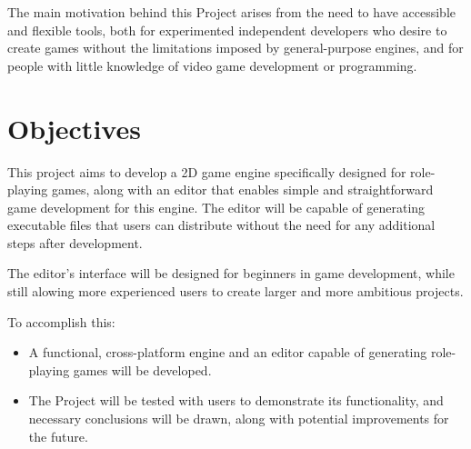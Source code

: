 \medskip

The main motivation behind this Project arises from the need to have accessible and flexible tools, both for experimented independent developers who desire to create games without the limitations imposed by general-purpose engines, and for people with little knowledge of video game development or programming.

\section*{Objectives}
This project aims to develop a 2D game engine specifically designed for role-playing games, along with an editor that enables simple and straightforward game development for this engine. The editor will be capable of generating executable files that users can distribute without the need for any additional steps after development.

\smallskip

The editor's interface will be designed for beginners in game development, while still alowing more experienced users to create larger and more ambitious projects.

\medskip

To accomplish this:
\begin{itemize}
	\item A functional, cross-platform engine and an editor capable of generating role-playing games will be developed.
	\item The Project will be tested with users to demonstrate its functionality, and necessary conclusions will be drawn, along with potential improvements for the future.
\end{itemize}

